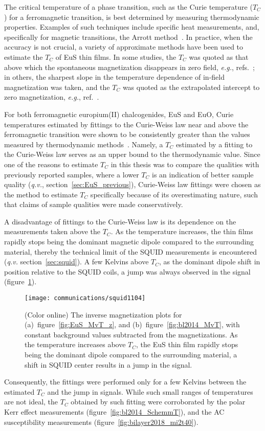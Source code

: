 The critical temperature of a phase transition, such as the Curie temperature ($T_C$) for a ferromagnetic transition, is best determined by measuring thermodynamic properties. Examples of such techniques include specific heat measurements, and, specifically for magnetic transitions, the Arrott method~\cite{Arrott1957}. In practice, when the accuracy is not crucial, a variety of approximate methods have been used to estimate the $T_C$ of EuS thin films. In some studies, the $T_C$ was quoted as that above which the spontaneous magnetization disappears in zero field, \textit{e.g.}, refs.~\cite{EuS_MBE_Dauth, Moodera2013}; in others, the sharpest slope in the temperature dependence of in-field magnetization was taken, and the $T_C$ was quoted as the extrapolated intercept to zero magnetization, \textit{e.g.}, ref.~\cite{EuS_PLD1}.

For both ferromagnetic europium(II) chalcogenides, EuS and EuO, Curie temperatures estimated by fittings to the Curie-Weiss law near and above the ferromagnetic transition were shown to be consistently greater than the values measured by thermodynamic methods~\cite{Eu_mag_compounds}. Namely, a $T_C$ estimated by a fitting to the Curie-Weiss law serves as an upper bound to the thermodynamic value. Since one of the reasons to estimate $T_C$ in this thesis was to compare the qualities with previously reported samples, where a lower $T_C$ is an indication of better sample quality (\textit{q.v.}, section~\ref{sec:EuS_previous}), Curie-Weiss law fittings were chosen as the method to estimate $T_C$ specifically because of its overestimating nature, such that claims of sample qualities were made conservatively.

A disadvantage of fittings to the Curie-Weiss law is its dependence on the measurements taken above the $T_C$. As the temperature increases, the thin films rapidly stops being the dominant magnetic dipole compared to the surrounding material, thereby the technical limit of the SQUID measurements is encountered (\textit{q.v.} section~\ref{sec:squid}). A few Kelvins above $T_C$, as the dominant dipole shift in position relative to the SQUID coils, a jump was always observed in the signal (figure~\ref{fig:inverse_M}).%
\begin{figure}[ht]%
    \centering%
    \texttt{[image: communications/squid1104]}%
    \caption[Inverse magnetization plots for EuS thin films]{\label{fig:inverse_M}(Color online) The inverse magnetization plots for (a)~figure~\ref{fig:EuS_MvT_z}, and (b)~figure~\ref{fig:bl2014_MvT}, with constant background values subtracted from the magnetizations. As the temperature increases above $T_C$, the EuS thin film rapidly stops being the dominant dipole compared to the surrounding material, a shift in SQUID center results in a jump in the signal.}%
\end{figure} %
%
Consequently, the fittings were performed only for a few Kelvins between the estimated $T_C$ and the jump in signals. While such small ranges of temperatures are not ideal, the $T_C$ obtained by such fitting were corroborated by the polar Kerr effect measurements (figure~\ref{fig:bl2014_SchemmT}), and the AC susceptibility measurements (figure~\ref{fig:bilayer2018_mi2t40}).

